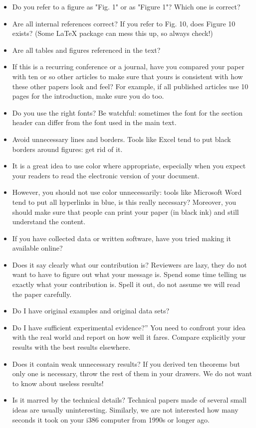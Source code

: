 \begin{itemize}
\item Do you refer to a figure as "Fig. 1" or as "Figure 1"? Which one is correct?
\item Are all internal references correct? If you refer to Fig. 10, does Figure 10 exists? (Some LaTeX package can mess this up, so always check!)
\item Are all tables and figures referenced in the text?
\item If this is a recurring conference or a journal, have you compared your paper with ten or so other articles to make sure that yours is consistent with how these other papers look and feel? For example, if all published articles use 10 pages for the introduction, make sure you do too.
\item Do you use the right fonts? Be watchful: sometimes the font for the section header can differ from the font used in the main text.
\item Avoid unnecessary lines and borders. Tools like Excel tend to put black borders around figures: get rid of it.
\item It is a great idea to use color where appropriate, especially when you expect your readers to read the electronic version of your document.
\item However, you should not use color unnecessarily: tools like Microsoft Word tend to put all hyperlinks in blue, is this really necessary? Moreover, you should make sure that people can print your paper (in black ink) and still understand the content.
\item If you have collected data or written software, have you tried making it available online?
\item Does it say clearly what our contribution is? Reviewers are lazy, they do not want to have to figure out what your message is. Spend some time telling us exactly what your contribution is. Spell it out, do not assume we will read the paper carefully.
\item Do I have original examples and original data sets?
\item Do I have sufficient experimental evidence?'' You need to confront your idea with the real world and report on how well it fares. Compare explicitly your results with the best results elsewhere.
\item Does it contain weak unnecessary results? If you derived ten theorems but only one is necessary, throw the rest of them in your drawers. We do not want to know about useless results!
\item Is it marred by the technical details? Technical papers made of several small ideas are usually uninteresting. Similarly, we are not interested how many seconds it took on your i386 computer from 1990s or longer ago.

\end{itemize}
